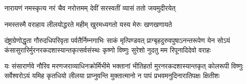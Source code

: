 
\twolineshloka
{नारायणं नमस्कृत्य नरं चैव नरोत्तमम्}
{देवीं सरस्वतीं व्यासं ततो जयमुदीरयेत्}

\twolineshloka
{नमस्तस्मै वराहाय लीलयोद्धरते महीम्}
{खुरमध्यगतो यस्य मेरुः खणखणायते}

\fourlineindentedshloka
{दंष्ट्राग्रेणोद्धृता गौरुदधिपरिवृता पर्वतैर्निम्नगाभिः}
{साकं मृत्पिण्डवत् प्राग्बृहदुरुवपुषाऽनन्तरूपेण येन}
{सोऽयं कंसासुरारिर्मुरनरकदशास्यान्तकृत्सर्वसंस्थः}
{कृष्णो विष्णुः सुरेशो नुदतु मम रिपूनादिदेवो वराहः}

\fourlineindentedshloka
{यः संसारार्णवे नौरिव मरणजराव्याधिनक्रोर्मिभीमे}
{भक्तानां भीतिहर्ता मुरनरकदशास्यान्तकृत् कोलरूपी}
{विष्णुः सर्वेश्वरोऽयं यमिह कृतधियो लीलया प्राप्नुवन्ति}
{मुक्तात्मानो न पापं प्रभवमनुदिनारातिपक्षः क्षितीशः}
